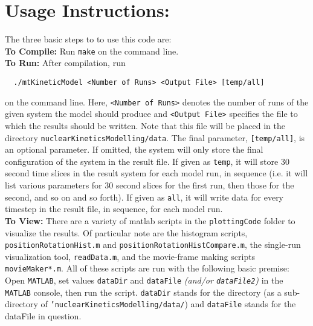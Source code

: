 \documentclass{article}
\begin{document}
\section{Usage Instructions:}
  The three basic steps to to use this code are:\\
  \textbf{To Compile:} Run \texttt{make} on the command line.\\
  \textbf{To Run:} After compilation, run
  \begin{verbatim}
  ./mtKineticModel <Number of Runs> <Output File> [temp/all]
  \end{verbatim}
  on the command line. Here, \texttt{<Number of Runs>} denotes the number of
  runs of the given system the model should produce and \texttt{<Output File>}
  specifies the file to which the results should be written. Note that this file
  will be placed in the directory \texttt{nuclearKineticsModelling/data}. The
  final parameter, \texttt{[temp/all]}, is an optional parameter. If omitted,
  the system will only store the final configuration of the system in the result
  file. If given as \texttt{temp}, it will store 30 second time slices in the
  result system for each model run, in sequence (i.e. it will list various
  parameters for 30 second slices for the first run, then those for the second,
  and so on and so forth). If given as \texttt{all}, it will write data for
  every timestep in the result file, in sequence, for each model run. \\
  \textbf{To View: } There are a variety of matlab scripts in the
  \texttt{plottingCode} folder to visualize the results. Of particular note are
  the histogram scripts, \texttt{positionRotationHist.m} and
  \texttt{positionRotationHistCompare.m}, the single-run visualization tool,
  \texttt{readData.m}, and the movie-frame making scripts
  \texttt{movieMaker*.m}. All of these scripts are run with the following basic
  premise: Open \texttt{MATLAB}, set values \texttt{dataDir} and
  \texttt{dataFile} \textit{(and/or \texttt{dataFile2})} in the \texttt{MATLAB}
  console, then run the script. \texttt{dataDir} stands for the directory (as a
  sub-directory of \texttt{'nuclearKineticsModelling/data/}) and
  \texttt{dataFile} stands for the dataFile in question. 
\end{document}
